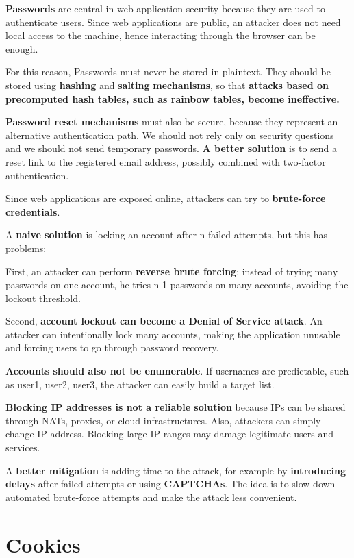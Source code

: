 \documentclass{article}
\begin{document}
\textbf{Passwords} are central in web application security because they are used to authenticate users. Since web applications are public, an attacker does not need local access to the machine, hence interacting through the browser can be enough.

For this reason, Passwords must never be stored in plaintext. They should be stored using \textbf{hashing} and \textbf{salting} \textbf{mechanisms}, so that \textbf{attacks based on precomputed hash tables, such as rainbow tables, become ineffective.}

\textbf{Password reset mechanisms} must also be secure, because they represent an alternative authentication path. We should not rely only on security questions and we should not send temporary passwords. \textbf{A better solution} is to send a reset link to the registered email address, possibly combined with two-factor authentication.

Since web applications are exposed online, attackers can try to \textbf{brute-force credentials}.

A \textbf{naive solution} is locking an account after n failed attempts, but this has problems:

First, an attacker can perform \textbf{reverse brute forcing}: instead of trying many passwords on one account, he tries n-1 passwords on many accounts, avoiding the lockout threshold.

Second, \textbf{account lockout can become a Denial of Service attack}. An attacker can intentionally lock many accounts, making the application unusable and forcing users to go through password recovery.

\textbf{Accounts should also not be enumerable}. If usernames are predictable, such as user1, user2, user3, the attacker can easily build a target list.

\textbf{Blocking IP addresses is not a reliable solution} because IPs can be shared through NATs, proxies, or cloud infrastructures. Also, attackers can simply change IP address. Blocking large IP ranges may damage legitimate users and services.

A \textbf{better mitigation} is adding time to the attack, for example by \textbf{introducing delays} after failed attempts or using \textbf{CAPTCHAs}. The idea is to slow down automated brute-force attempts and make the attack less convenient.

\section{Cookies}
\end{document}
